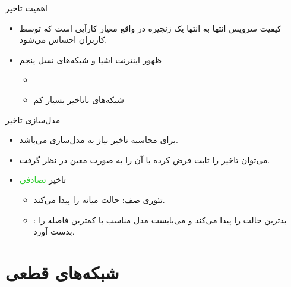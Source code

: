 \documentclass[dvipsnames]{beamer}
\makeatletter
\newcommand{\RTList}{\raggedleft\rightskip\@totalleftmargin}
\makeatother
\begin{document}
\begin{persian}
	\begin{frame}{اهمیت تاخیر}
		\begin{itemize}\RTList{}
			\justifying%
			\item کیفیت سرویس انتها به انتها یک زنجیره در واقع معیار کارآیی است که توسط کاربران احساس می‌شود.
			\item ظهور اینترنت اشیا و شبکه‌های نسل پنجم
			\begin{itemize}\RTList{}
				\item {}
				\item شبکه‌های باتاخیر بسیار کم
			\end{itemize}
		\end{itemize}
	\end{frame}

	\begin{frame}{مدل‌سازی تاخیر}
		\begin{itemize}\RTList{}
			\justifying%
			\item برای محاسبه تاخیر نیاز به مدل‌سازی می‌باشد.
			\item می‌توان تاخیر را ثابت فرض کرده یا آن را به صورت معین در نظر گرفت.
			\item تاخیر \textcolor{LimeGreen}{تصادفی}
			\begin{itemize}\RTList{}
				\item تئوری صف: حالت میانه را پیدا می‌کند.
				\item \textcolor{Orange}{}: بدترین حالت را پیدا می‌کند و می‌بایست مدل مناسب با کمترین فاصله را بدست آورد.
			\end{itemize}
		\end{itemize}
	\end{frame}


	\section{شبکه‌های قطعی}


\end{persian}
\end{document}
